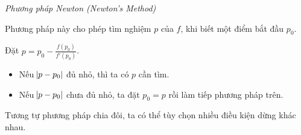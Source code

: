 \documentclass[../../Lectures]{subfiles}
\begin{document}
\begin{method}\label{method:newton}
    \emph{Phương pháp Newton (Newton's Method)}

    Phương pháp này cho phép tìm nghiệm \(p\) của \(f\), khi biết một điểm bắt
    đầu \(p_0\).

    Đặt \(p = p_0 - \frac{f(p_0)}{f'(p_0)}\).

    \begin{itemize}
        \item Nếu \(\abs{p - p_0}\) đủ nhỏ, thì ta có \(p\) cần tìm.
        \item Nếu \(\abs{p - p_0}\) chưa đủ nhỏ, ta đặt \(p_0 = p\) rồi làm tiếp
            phương pháp trên.
    \end{itemize}
\end{method}

Tương tự phương pháp chia đôi, ta có thể tùy chọn nhiều điều kiện dừng khác
nhau.
\end{document}
